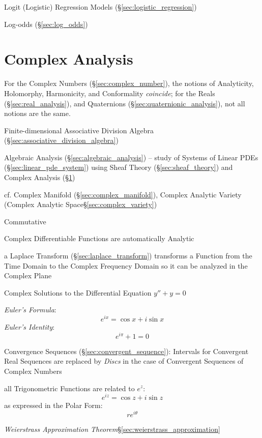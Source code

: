 Logit (Logistic) Regression Models (\S\ref{sec:logistic_regression})

Log-odds (\S\ref{sec:log_odds})



\section{Complex Analysis}\label{sec:complex_analysis}

For the Complex Numbers (\S\ref{sec:complex_number}), the notions of
Analyticity, Holomorphy, Harmonicity, and Conformality \emph{coincide}; for the
Reals (\S\ref{sec:real_analysis}), and Quaternions
(\S\ref{sec:quaternionic_analysis}), not all notions are the same.

Finite-dimensional Associative Division Algebra
(\S\ref{sec:associative_division_algebra})

\fist Algebraic Analysis (\S\ref{sec:algebraic_analysis}) -- study of Systems of
Linear PDEs (\S\ref{sec:linear_pde_system}) using Sheaf Theory
(\S\ref{sec:sheaf_theory}) and Complex Analysis (\S\ref{sec:complex_analysis})

\fist cf. Complex Manifold (\S\ref{sec:complex_manifold}), Complex Analytic
Variety (Complex Analytic Space\S\ref{sec:complex_variety})

Commutative

Complex Differentiable Functions are automatically Analytic %

a Laplace Transform (\S\ref{sec:laplace_transform}) transforms a Function from
the Time Domain to the Complex Frequency Domain so it can be analyzed in the
Complex Plane

Complex Solutions to the Differential Equation $y'' + y = 0$

\emph{Euler's Formula}:
\[
  e^{ix} = \cos x + i \sin x
\]
\emph{Euler's Identity}:
\[
  e^{i\pi} + 1 = 0
\]

Convergence Sequences (\S\ref{sec:convergent_sequence}): Intervals
for Convergent Real Sequences are replaced by \emph{Discs} in the case of
Convergent Sequences of Complex Numbers

all Trigonometric Functions are related to $e^z$:
\[
  e^{iz} = \cos z + i \sin z
\]
as expressed in the Polar Form:
\[
  re^{i\theta}
\]


\emph{Weierstrass Approximation Theorem}\S\ref{sec:weierstrass_approximation}

